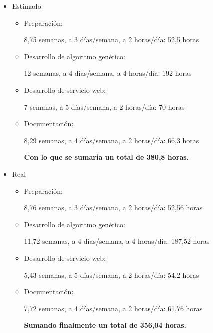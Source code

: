 \begin{itemize}
	
	\item Estimado
		\begin{itemize}
			\item Preparación: 
	
			8,75 semanas, a 3 días/semana, a 2 horas/día: 52,5 horas	
			
			\item Desarrollo de algoritmo genético: 
			
			12 semanas, a 4 días/semana, a 4 horas/día:  192 horas

			\item Desarrollo de servicio web: 
			
			7 semanas, a 5 días/semana, a 2 horas/día: 70 horas
			
			\item Documentación: 
			
			8,29 semanas, a 4 días/semana, a 2 horas/día: 66,3 horas
			
			\bigskip			
			\textbf{Con lo que se sumaría un total de 380,8 horas.}
			
		\end{itemize}
	
	\item Real
		\begin{itemize}
			\item Preparación: 
			
			8,76 semanas, a  3 días/semana, a  2 horas/día:  52,56 horas
			
			\item Desarrollo de algoritmo genético: 
			
			11,72 semanas, a 4 días/semana, a 4 horas/día: 187,52 horas
			
			\item Desarrollo de servicio web: 
			
			5,43 semanas, a 5 días/semana, a 2 horas/día:  54,2 horas
			
			\item Documentación: 
			
			7,72 semanas, a 4 días/semana, a 2 horas/día: 61,76 horas
			
			\bigskip			
			\textbf{Sumando finalmente un total de 356,04 horas.}

		\end{itemize}
		
\end{itemize}

